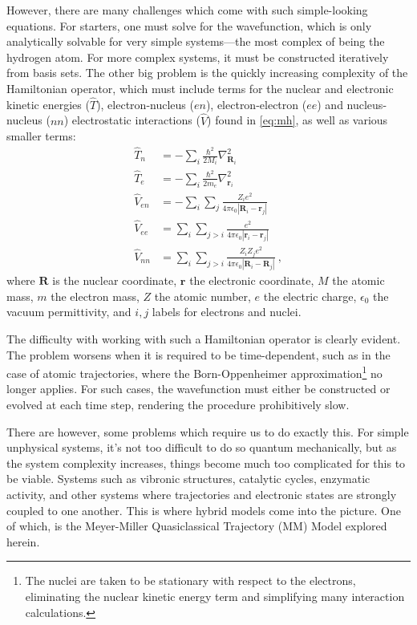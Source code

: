 However, there are many challenges which come with such simple-looking equations. For starters, one must solve for the wavefunction, which is only analytically solvable for very simple systems---the most complex of being the hydrogen atom. For more complex systems, it must be constructed iteratively from basis sets. The other big problem is the quickly increasing complexity of the Hamiltonian operator, which must include terms for the nuclear and electronic kinetic energies ($ \hat{T} $), electron-nucleus ($ en $), electron-electron ($ ee $) and nucleus-nucleus ($ nn $) electrostatic interactions ($ \hat{V} $) found in \cref{eq:mh}, as well as various smaller terms:
\begin{subequations}\label{eq:mh}
\begin{align}
\hat{T}_{n} &= -\sum\limits_{i} \frac{\hbar^{2}}{2M_{i}}\nabla^{2}_{\bm{R}_{i}}\\
\hat{T}_{e} &= -\sum\limits_{i} \frac{\hbar^{2}}{2m_{e}}\nabla^{2}_{\bm{r}_{i}}\\
\hat{V}_{en} &= -\sum\limits_{i}\sum\limits_{j} \frac{Z_{i}e^{2}}{4\pi \epsilon_{0}|\bm{R}_{i}-\bm{r}_{j}|}\\
\hat{V}_{ee} &= \sum\limits_{i}\sum\limits_{j>i} \frac{e^{2}}{4\pi \epsilon_{0}|\bm{r}_{i}-\bm{r}_{j}|}\\
\hat{V}_{nn} &= \sum\limits_{i}\sum\limits_{j>i} \frac{Z_{i}Z_{j}e^{2}}{4\pi \epsilon_{0}|\bm{R}_{i}-\bm{R}_{j}|}~,
\end{align}
\end{subequations}
where $ \bm{R} $ is the nuclear coordinate, $ \bm{r} $ the electronic coordinate, $ M $ the atomic mass, $ m $ the electron mass, $ Z $ the atomic number, $ e $ the electric charge, $ \epsilon_{0} $ the vacuum permittivity, and $ i,j $ labels for electrons and nuclei.

The difficulty with working with such a Hamiltonian operator is clearly evident. The problem worsens when it is required to be time-dependent, such as in the case of atomic trajectories, where the Born-Oppenheimer approximation\footnote{The nuclei are taken to be stationary with respect to the electrons, eliminating the nuclear kinetic energy term and simplifying many interaction calculations.} no longer applies. For such cases, the wavefunction must either be constructed or evolved at each time step, rendering the procedure prohibitively slow.

There are however, some problems which require us to do exactly this. For simple unphysical systems, it's not too difficult to do so quantum mechanically, but as the system complexity increases, things become much too complicated for this to be viable. Systems such as vibronic structures, catalytic cycles, enzymatic activity, and other systems where trajectories and electronic states are strongly coupled to one another. This is where hybrid models come into the picture. One of which, is the Meyer-Miller Quasiclassical Trajectory (MM) Model explored herein.
%
